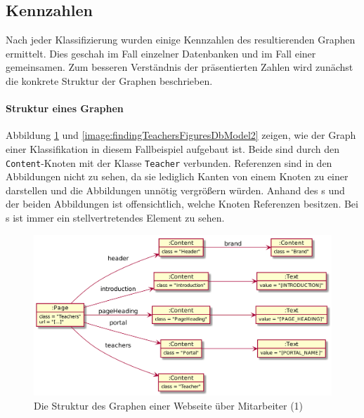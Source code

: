 \subsection{Kennzahlen}
    Nach jeder Klassifizierung wurden einige Kennzahlen des
    resultierenden Graphen ermittelt.
    Dies geschah im Fall einzelner Datenbanken und im Fall
    einer gemeinsamen.
    Zum besseren Verständnis der präsentierten Zahlen wird
    zunächst die konkrete Struktur der Graphen beschrieben.

    \paragraph*{Struktur eines Graphen}
    Abbildung \ref{image:findingTeachersFiguresDbModel1}
    und \ref{image:findingTeachersFiguresDbModel2} zeigen,
    wie der Graph einer Klassifikation in diesem Fallbeispiel aufgebaut ist.
    Beide sind durch den \texttt{Content}-Knoten mit der Klasse \texttt{Teacher} verbunden.
    Referenzen sind in den Abbildungen nicht zu sehen,
    da sie lediglich Kanten von einem Knoten zu einer {\resource} darstellen
    und die Abbildungen unnötig vergrößern würden.
    Anhand des {\classificationModel}s und der beiden Abbildungen ist
    offensichtlich, welche Knoten Referenzen besitzen.
    Bei {\collectionFeature}s ist immer ein stellvertretendes Element zu sehen.

    \begin{figure}[htb]
        \centering
        \includegraphics[scale=\imageScalingFactor]{../resources/findings/case-study-1/dbmodel/dbmodel1.png}
        \caption{Die Struktur des Graphen einer Webseite über Mitarbeiter (1)}
        \label{image:findingTeachersFiguresDbModel1}
    \end{figure}

